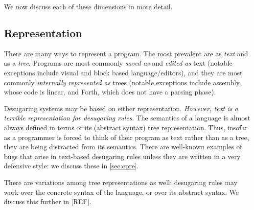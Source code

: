 

We now discuss each of these dimensions in more detail.

\subsection{Representation}

There are many ways to represent a program. The most prevalent are as
\emph{text} and as a \emph{tree}. Programs are most commonly
\emph{saved as} and \emph{edited as} text (notable exceptions include
visual and block based language/editors), and they are most commonly
\emph{internally represented as} trees (notable exceptions include
assembly, whose code is linear, and Forth, which does not have a
parsing phase).

Desugaring systems may be based on either representation.
\emph{However, text is a terrible representation for desugaring rules.}
The semantics of a language is almost always defined in terms of its
(abstract syntax) tree representation. Thus, insofar as a programmer
is forced to think of their program as text rather
than as a tree, they are being distracted from its semantics. There
are well-known examples of bugs that arise in text-based desugaring
rules unless they are written in a very defensive style: we discuss
these in \ref{sec:cpre}.

There are variations among tree representations as well: desugaring
rules may work over the concrete syntax of the language, or over its
abstract syntax. We discuss this further in [REF].

